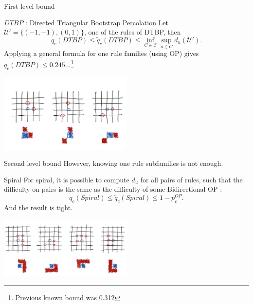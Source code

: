\begin{frame}{First level bound}
	\begin{block}{$DTBP$ : Directed Triangular Bootstrap Percolation}
		Let $\mathcal{U}' = \{(-1, -1), (0,1)\}$, one of the rules of DTBP, then
		\begin{equation*}
			q_c(DTBP) \leq \tilde q_c(DTBP) \leq \inf_{C\in\mathcal{C}} \sup_{u\in C} d_u(\mathcal{U}').
		\end{equation*}
		Applying a general formula for one rule families (using OP) gives $q_c(DTBP) \leq 0.245...$\footnote{Previous known bound was 0.312}
	\end{block}
	\begin{center}
    	 	\includegraphics[width=0.5\textwidth]{dtbp.jpg}
	\end{center}
\end{frame}

\begin{frame}{Second level bound}
	However, knowing one rule subfamilies is not enough.
	\begin{block}{Spiral}
		For spiral, it is possible to compute $d_u$ for all pairs of rules, such that the difficulty on pairs is the same as the difficulty of some Bidirectional OP :
		\begin{equation*}
			q_c(Spiral) \leq \tilde q_c(Spiral) \leq 1 - p_c^{OP}.
		\end{equation*}
		And the result is tight.
	\end{block}
	\begin{center}
    	 	\includegraphics[width=0.5\textwidth]{spiral.jpg}
	\end{center}
\end{frame}
